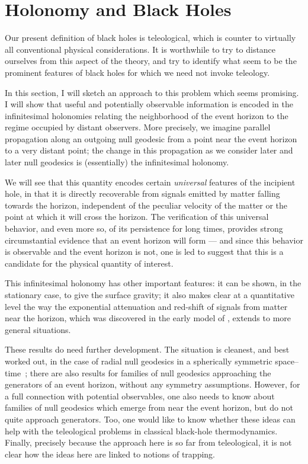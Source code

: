 \documentclass[
%
draft    %
,numberedheadings 
,bibliocites
  ]
  {aipproc}
\begin{document}
\section{Holonomy and Black Holes}

Our present definition of black holes is teleological, which is counter to virtually all conventional physical considerations.  It is worthwhile to try to distance ourselves from this aspect of the theory, and try to identify what seem to be the prominent features of black holes for which we need not invoke teleology.  

In this section, I will sketch an approach to this problem which seems promising.  I will show that useful and potentially observable information is encoded in the infinitesimal holonomies relating the neighborhood of the event horizon to the regime occupied by distant observers.  More precisely, we imagine parallel propagation along an outgoing null geodesic from a point near the event horizon to a very distant point; the change in this propagation as we consider later and later null geodesics is (essentially) the infinitesimal holonomy.  

We will see that this quantity encodes certain {\em universal} features of the incipient hole, in that it is directly recoverable from signals emitted by matter falling towards the horizon, independent of the peculiar velocity of the matter or the point at which it will cross the horizon.  The verification of this universal behavior, and even more so, of its persistence for long times, provides strong circumstantial evidence that an event horizon will form --- and since this behavior is observable and the event horizon is not, one is led to suggest that this is a candidate for the physical quantity of interest.  

This infinitesimal holonomy has other important features:  it can be shown, in the stationary case, to give the surface gravity; it also makes clear at a quantitative level the way the exponential attenuation and red-shift of signals from matter near the horizon, which was discovered in the early model of \citet{Oppenheimer:1939ue}, extends to more general situations.

These results do need further development.  The situation is cleanest, and best worked out, in the case of radial null geodesics in a spherically symmetric space--time~\citep{Helfer:2001}; there are also results for families of null geodesics approaching the generators of an event horizon, without any symmetry assumptions.  However, for a full connection with potential observables, one also needs to know about families of null geodesics which emerge from near the event horizon, but do not quite approach generators.
Too, one would like to know whether these ideas can help with the teleological problems in classical black-hole thermodynamics.  Finally, precisely because the approach here is so far from teleological, it is not clear how the ideas here are linked to notions of trapping.
\end{document}
